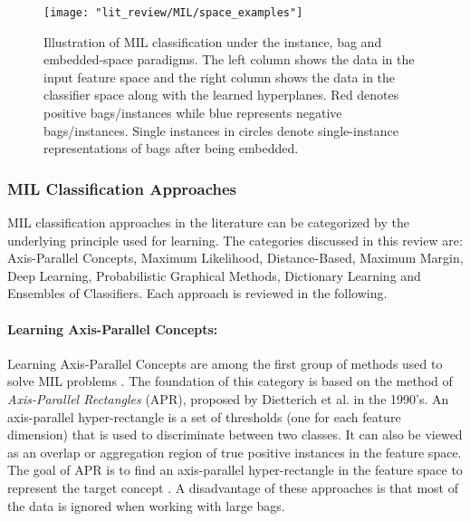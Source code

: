 \begin{center}
	\begin{figure*}[h]
		\centering
		\texttt{[image: "lit\_review/MIL/space\_examples"]}
		\caption[MIL classification space paradigms.]{Illustration of MIL classification under the instance, bag and embedded-space paradigms.  The left column shows the data in the input feature space and the right column shows the data in the  classifier space along with the learned hyperplanes.  Red denotes positive bags/instances while blue represents negative bags/instances.  Single instances in circles denote single-instance representations of bags after being embedded.}
		\label{fig:mil_classification_space_paradigm}
	\end{figure*}
\end{center}

\subsubsection{MIL Classification Approaches}
MIL classification approaches in the literature can be categorized by the underlying principle used for learning.  The categories discussed in this review are: Axis-Parallel Concepts, Maximum Likelihood, Distance-Based, Maximum Margin,  Deep Learning, Probabilistic Graphical Methods, Dictionary Learning and Ensembles of Classifiers.  Each approach is reviewed in the following.

\paragraph{Learning Axis-Parallel Concepts:}
Learning Axis-Parallel Concepts are among the first group of methods used to solve MIL problems \citep{Dietterich1996AxisParallelRectangles}.  The foundation of this category is based on the method of \textit{Axis-Parallel Rectangles} (APR), proposed by Dietterich et al. in the 1990's.  An axis-parallel hyper-rectangle is a set of thresholds (one for each feature dimension) that is used to discriminate between two classes. It can also be viewed as an overlap or aggregation region of true positive instances in the feature space. The goal of APR is to find an axis-parallel hyper-rectangle in the feature space to represent the target concept \citep{Ghaffarzadegan2018MILVAE, Bocinsky2019SPIEMIACEInitialization, Jiao2017Thesis}.  A disadvantage of these approaches is that most of the data is ignored when working with large bags.    

